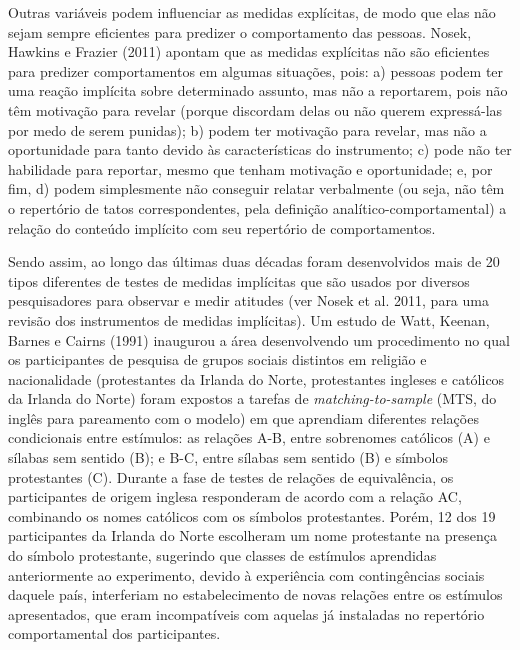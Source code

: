 Outras variáveis podem influenciar as medidas explícitas, de modo que elas não sejam sempre eficientes para predizer o comportamento das pessoas. Nosek, Hawkins e Frazier (2011) apontam que as medidas explícitas não são eficientes para predizer comportamentos em algumas situações, pois: a) pessoas podem ter uma reação implícita sobre determinado assunto, mas não a reportarem, pois não têm motivação para revelar (porque discordam delas ou não querem expressá-las por medo de serem punidas); b) podem ter motivação para revelar, mas não a oportunidade para tanto devido às características do instrumento; c) pode não ter habilidade para reportar, mesmo que tenham motivação e oportunidade; e, por fim, d) podem simplesmente não conseguir relatar verbalmente (ou seja, não têm o repertório de tatos correspondentes, pela definição analítico-comportamental) a relação do conteúdo implícito com seu repertório de comportamentos.

Sendo assim, ao longo das últimas duas décadas foram desenvolvidos mais de 20 tipos diferentes de testes de medidas implícitas que são usados por diversos pesquisadores para observar e medir atitudes (ver Nosek et al. 2011, para uma revisão dos instrumentos de medidas implícitas). Um estudo de Watt, Keenan, Barnes e Cairns (1991) inaugurou a área desenvolvendo um procedimento no qual os participantes de pesquisa de grupos sociais distintos em religião e nacionalidade (protestantes da Irlanda do Norte, protestantes ingleses e católicos da Irlanda do Norte) foram expostos a tarefas de \textit{matching-to-sample} (MTS, do inglês para pareamento com o modelo) em que aprendiam diferentes relações condicionais entre estímulos: as relações A-B, entre sobrenomes católicos (A) e sílabas sem sentido (B); e B-C, entre sílabas sem sentido (B) e símbolos protestantes (C). Durante a fase de testes de relações de equivalência, os participantes de origem inglesa responderam de acordo com a relação AC, combinando os nomes católicos com os símbolos protestantes. Porém, 12 dos 19 participantes da Irlanda do Norte escolheram um nome protestante na presença do símbolo protestante, sugerindo que classes de estímulos aprendidas anteriormente ao experimento, devido à experiência com contingências sociais daquele país, interferiam no estabelecimento de novas relações entre os estímulos apresentados, que eram incompatíveis com aquelas já instaladas no repertório comportamental dos participantes.

